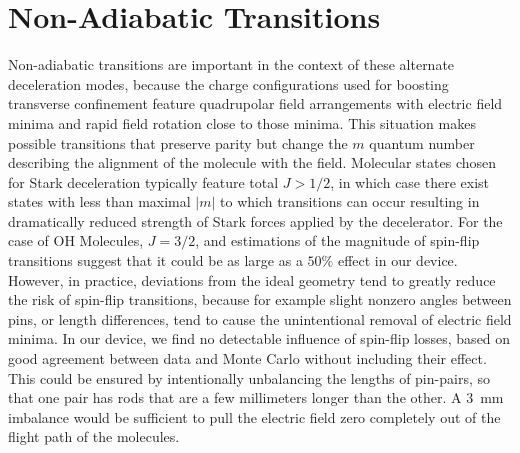 \documentclass[%
 reprint,
 amsmath,amssymb,
 aps,
pra,
]{revtex4-1}
\begin{document}

\section{Non-Adiabatic Transitions}
Non-adiabatic transitions are important in the context of these alternate deceleration modes, because the charge configurations used for boosting transverse confinement feature quadrupolar field arrangements with electric field minima and rapid field rotation close to those minima.
This situation makes possible transitions that preserve parity but change the $m$ quantum number describing the alignment of the molecule with the field.
Molecular states chosen for Stark deceleration typically feature total $J>1/2$, in which case there exist states with less than maximal $|m|$ to which transitions can occur resulting in dramatically reduced strength of Stark forces applied by the decelerator.
For the case of OH Molecules, $J=3/2$, and estimations of the magnitude of spin-flip transitions suggest that it could be as large as a $50\%$ effect in our device. 
However, in practice, deviations from the ideal geometry tend to greatly reduce the risk of spin-flip transitions, because for example slight nonzero angles between pins, or length differences, tend to cause the unintentional removal of electric field minima.
In our device, we find no detectable influence of spin-flip losses, based on good agreement between data and Monte Carlo without including their effect.
This could be ensured by intentionally unbalancing the lengths of pin-pairs, so that one pair has rods that are a few millimeters longer than the other. A $3$~mm imbalance would be sufficient to pull the electric field zero completely out of the flight path of the molecules. 
\end{document}
